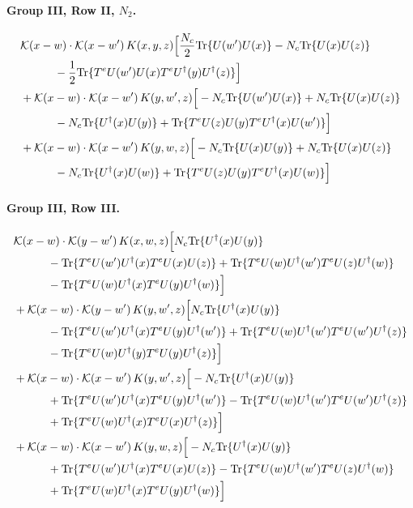 \documentclass[10pt]{article}
\numberwithin{equation}{section}
\begin{document}
\paragraph{Group III, Row II, $N_2$.}

\begin{align}
&\mathcal K(x-w)\cdot\mathcal K(x-w')\,K(x,y,z)\Big[\frac{N_c}{2}{\rm Tr}\{U(w')U(x)\}-N_c{\rm Tr}\{U(x)U(z)\}\notag\\
&\quad\quad\quad-\frac{1}{2}{\rm Tr}\{T^eU(w')U(x)T^eU^\dagger(y)U^\dagger(z)\}\Big]\notag\\
&+\mathcal K(x-w)\cdot\mathcal K(x-w')\,K(y,w',z)\Big[-N_c{\rm Tr}\{U(w')U(x)\}+N_c{\rm Tr}\{U(x)U(z)\}\notag\\
&\quad\quad\quad-N_c{\rm Tr}\{U^\dagger(x)U(y)\}+{\rm Tr}\{T^eU(z)U(y)T^eU^\dagger(x)U(w')\}\Big]\notag\\
&+\mathcal K(x-w)\cdot\mathcal K(x-w')\,K(y,w,z)\Big[-N_c{\rm Tr}\{U(x)U(y)\}+N_c{\rm Tr}\{U(x)U(z)\}\notag\\
&\quad\quad\quad-N_c{\rm Tr}\{U^\dagger(x)U(w)\}+{\rm Tr}\{T^eU(z)U(y)T^eU^\dagger(x)U(w)\}\Big]
\label{eq:list17}
\end{align}

\paragraph{Group III, Row III.}

\begin{align}
&\mathcal K(x-w)\cdot\mathcal K(y-w')\,K(x,w,z)\Big[N_c{\rm Tr}\{U^\dagger(x)U(y)\}\notag\\
&\quad\quad\quad-{\rm Tr}\{T^eU(w')U^\dagger(x)T^eU(x)U(z)\}+{\rm Tr}\{T^eU(w)U^\dagger(w')T^eU(z)U^\dagger(w)\}\notag\\
&\quad\quad\quad-{\rm Tr}\{T^eU(w)U^\dagger(x)T^eU(y)U^\dagger(w)\}\Big]\notag\\
&+\mathcal K(x-w)\cdot\mathcal K(y-w')\,K(y,w',z)\Big[N_c{\rm Tr}\{U^\dagger(x)U(y)\}\notag\\
&\quad\quad\quad-{\rm Tr}\{T^eU(w')U^\dagger(x)T^eU(y)U^\dagger(w')\}+{\rm Tr}\{T^eU(w)U^\dagger(w')T^eU(w')U^\dagger(z)\}\notag\\
&\quad\quad\quad-{\rm Tr}\{T^eU(w)U^\dagger(y)T^eU(y)U^\dagger(z)\}\Big]\notag\\
&+\mathcal K(x-w)\cdot\mathcal K(x-w')\,K(y,w',z)\Big[-N_c{\rm Tr}\{U^\dagger(x)U(y)\}\notag\\
&\quad\quad\quad+{\rm Tr}\{T^eU(w')U^\dagger(x)T^eU(y)U^\dagger(w')\}-{\rm Tr}\{T^eU(w)U^\dagger(w')T^eU(w')U^\dagger(z)\}\notag\\
&\quad\quad\quad+{\rm Tr}\{T^eU(w)U^\dagger(x)T^eU(x)U^\dagger(z)\}\Big]\notag\\
&+\mathcal K(x-w)\cdot\mathcal K(x-w')\,K(y,w,z)\Big[-N_c{\rm Tr}\{U^\dagger(x)U(y)\}\notag\\
&\quad\quad\quad+{\rm Tr}\{T^eU(w')U^\dagger(x)T^eU(x)U(z)\}-{\rm Tr}\{T^eU(w)U^\dagger(w')T^eU(z)U^\dagger(w)\}\notag\\
&\quad\quad\quad+{\rm Tr}\{T^eU(w)U^\dagger(x)T^eU(y)U^\dagger(w)\}\Big]
\label{eq:list18}
\end{align}
\end{document}
